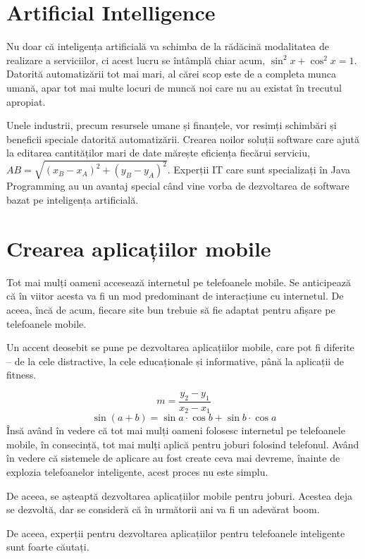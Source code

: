 \documentclass{article}
\begin{document}
\section{Artificial Intelligence}
\hspace{0.5 cm}Nu doar că inteligența artificială va schimba de la rădăcină modalitatea de realizare a serviciilor, ci acest lucru se întâmplă chiar acum, $\sin^2{x}+\cos^2{x}=1$. Datorită automatizării tot mai mari, al cărei scop este de a completa munca umană, apar tot mai multe locuri de muncă noi care nu au existat în trecutul apropiat.\par
Unele industrii, precum resursele umane și finanțele, vor resimți schimbări și beneficii speciale datorită automatizării. Crearea noilor soluții software care ajută la editarea cantităților mari de date mărește eficiența fiecărui serviciu, $AB=\sqrt{(x_B-x_A)^2+(y_B-y_A)^2}$. Experții IT care sunt specializați în Java Programming au un avantaj special când vine vorba de dezvoltarea de software bazat pe inteligența artificială.
\section{Crearea aplicațiilor mobile}
\hspace{0.5 cm}Tot mai mulți oameni accesează internetul pe telefoanele mobile. Se anticipează că în viitor acesta va fi un mod predominant de interacțiune cu internetul. De aceea, încă de acum, fiecare site bun trebuie să fie adaptat pentru afișare pe telefoanele mobile.\par
Un accent deosebit se pune pe dezvoltarea aplicațiilor mobile, care pot fi diferite – de la cele distractive, la cele educaționale și informative, până la aplicații de fitness.\par
\begin{equation}
m=\frac{y_2-y_1}{x_2-x_1}
\end{equation}
\begin{equation}
\sin{(a+b)}=\sin{a}\cdot\cos{b}+\sin{b}	\cdot\cos{a}
\end{equation}
Însă având în vedere că tot mai mulți oameni folosesc internetul pe telefoanele mobile, în consecință, tot mai mulți aplică pentru joburi folosind telefonul. Având în vedere că sistemele de aplicare au fost create ceva mai devreme, înainte de explozia telefoanelor inteligente, acest proces nu este simplu.\par
De aceea, se așteaptă dezvoltarea aplicațiilor mobile pentru joburi. Acestea deja se dezvoltă, dar se consideră că în următorii ani va fi un adevărat boom.\par
De aceea, experții pentru dezvoltarea aplicațiilor pentru telefoanele inteligente sunt foarte căutați.
\end{document}
